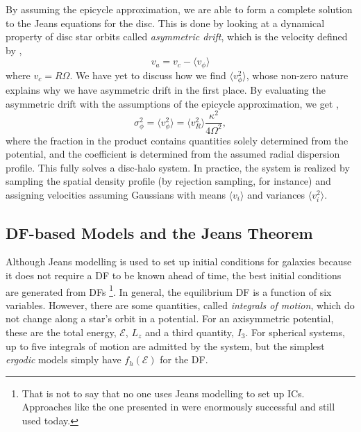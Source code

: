 By assuming the epicycle approximation, we are able to form a complete solution to the Jeans equations for the disc. This is done by looking at a dynamical property of disc star orbits called \textit{asymmetric drift}, which is the velocity defined by \citep{BT},
\begin{equation}
v_a = v_c -  \langle v_\phi \rangle
\end{equation}
where $v_c = R \Omega$. We have yet to discuss how we find $\langle v_\phi^2 \rangle$, whose non-zero nature explains why we have asymmetric drift in the first place. By evaluating the asymmetric drift with the assumptions of the epicycle approximation, we get \citep{hernquist_1993},
\begin{equation}
\sigma_\phi^2 = \langle v_\phi^2 \rangle = \langle v_R^2 \rangle \frac{\kappa^2}{4 \Omega^2},
\end{equation}
where the fraction in the product contains quantities solely determined from the potential, and the coefficient is determined from the assumed radial dispersion profile. This fully solves a disc-halo system. In practice, the system is realized by sampling the spatial density profile (by rejection sampling, for instance) and assigning velocities assuming Gaussians with means $\langle v_i \rangle$ and variances $\langle v_i^2 \rangle$. 

\subsection{DF-based Models and the Jeans Theorem}

Although Jeans modelling is used to set up initial conditions for galaxies because it does not require a DF to be known ahead of time, the best initial conditions are generated from DFs \footnote{That is not to say that no one uses Jeans modelling to set up ICs. Approaches like the one presented in \citet{hernquist_1993} were enormously successful and still used today.}. In general, the equilibrium DF is a function of six variables. However, there are some quantities, called \textit{integrals of motion}, which do not change along a star's orbit in a potential. For an axisymmetric potential, these are the total energy, $\mathcal{E}$, $L_z$ and a third quantity, $I_3$.  
For spherical systems, up to five integrals of motion are admitted by the system, but the simplest \textit{ergodic} models simply have $f_{h}(\mathcal{E})$ for the DF. 



